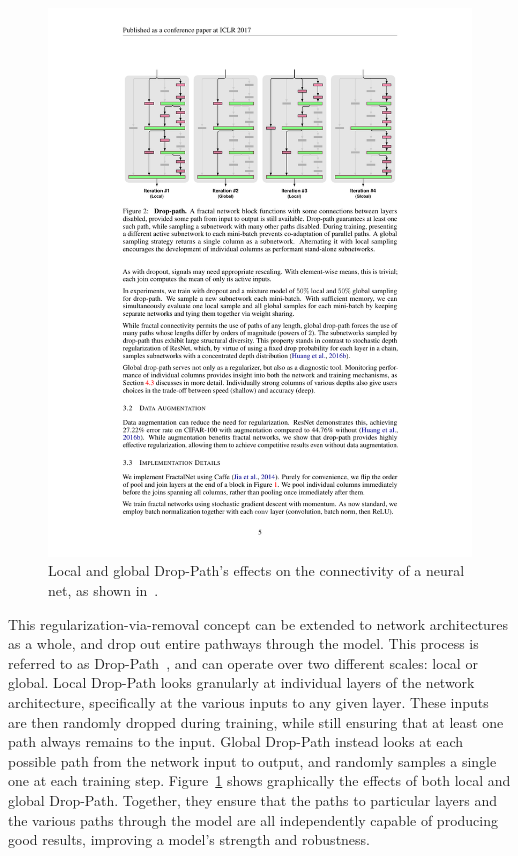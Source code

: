\begin{figure}[ht!]
	\centering
	\includegraphics[width=.95\textwidth]{training/droppath}
	\caption[Local and global Drop-Path's effects on connectivity]{Local and global Drop-Path's effects on the connectivity of a neural net, as shown in~\cite{larsson2016}.}
	\label{fig:droppath}
\end{figure}

This regularization-via-removal concept can be extended to network architectures as a whole, and drop out entire pathways
through the model. This process is referred to as Drop-Path~\citep{larsson2016}, and can operate over two different scales:
local or global. Local Drop-Path looks granularly at individual layers of the network architecture, specifically at the various
inputs to any given layer. These inputs are then randomly dropped during training, while still ensuring that at least one
path always remains to the input. Global Drop-Path instead looks at each possible path from the network input to output,
and randomly samples a single one at each training step. Figure~\ref{fig:droppath} shows graphically the effects of both
local and global Drop-Path. Together, they ensure that the paths to particular layers and the
various paths through the model are all independently capable of producing good results, improving a model's strength
and robustness.


